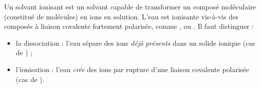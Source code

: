 \documentclass[11pt]{article}
\newcommand{\cle}[1]{{\popxbold\color{popdark}#1}}
\begin{document}
\begin{definition}
Un \cle{solvant ionisant} est un solvant capable de transformer un composé moléculaire (constitué de molécules) en ions en solution. L'eau est ionisante vis-à-vis des composés à liaison covalente fortement polarisée, comme ,  ou . Il faut distinguer :
\begin{itemize}
  \item la \cle{dissociation} : l'eau sépare des ions \emph{déjà présents} dans un solide ionique (cas de ) ;
  \item l'\cle{ionisation} : l'eau \emph{crée} des ions par rupture d'une liaison covalente polarisée (cas de ).
\end{itemize}
\end{definition}
\end{document}
